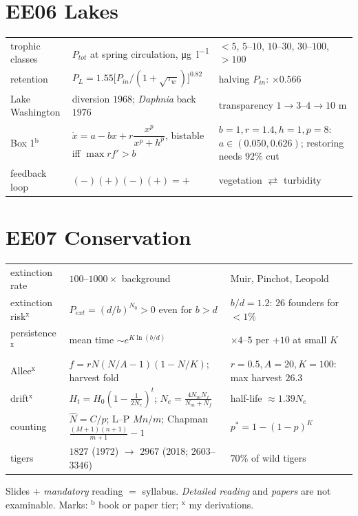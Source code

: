 \documentclass[9pt]{article}
\begin{document}
\section*{EE06 Lakes}
\begin{tabular}{@{}p{2.6cm}p{8.2cm}p{6.6cm}@{}}
\toprule
trophic classes & $P_{tot}$ at spring circulation, \unit{\micro\gram\per\litre} & $<5$, $5$--$10$, $10$--$30$, $30$--$100$, $>100$\\
retention & $P_L=1.55\bigl[P_{in}/(1+\sqrt{\tau_w})\bigr]^{0.82}$ & halving $P_{in}$: $\times0.566$\\
Lake Washington & diversion $1968$; \emph{Daphnia} back $1976$ & transparency $1\to3\text{--}4\to10$ m\\
Box 1$^{\text{b}}$ & $\dot x=a-bx+r\dfrac{x^p}{x^p+h^p}$, bistable iff $\max rf'>b$ & $b{=}1,r{=}1.4,h{=}1,p{=}8$: $a\in(0.050,0.626)$; restoring needs $92\%$ cut\\
feedback loop & $(-)(+)(-)(+)=+$ & vegetation $\rightleftarrows$ turbidity\\
\bottomrule
\end{tabular}

\section*{EE07 Conservation}
\begin{tabular}{@{}p{2.6cm}p{8.2cm}p{6.6cm}@{}}
\toprule
extinction rate & $100$--$1000\times$ background & Muir, Pinchot, Leopold\\
extinction risk$^{\text{x}}$ & $P_{ext}=(d/b)^{N_0}>0$ even for $b>d$ & $b/d=1.2$: $26$ founders for $<1\%$\\
persistence$^{\text{x}}$ & mean time $\sim e^{K\ln(b/d)}$ & $\times4$--$5$ per $+10$ at small $K$\\
Allee$^{\text{x}}$ & $f=rN(N/A-1)(1-N/K)$; harvest fold & $r{=}0.5,A{=}20,K{=}100$: max harvest $26.3$\\
drift$^{\text{x}}$ & $H_t=H_0(1-\tfrac1{2N_e})^t$; \quad $N_e=\tfrac{4N_mN_f}{N_m+N_f}$ & half-life $\approx1.39N_e$\\
counting & $\hat N=C/\hat p$; \quad L--P $Mn/m$; \quad Chapman $\tfrac{(M+1)(n+1)}{m+1}-1$ & $p^*=1-(1-p)^K$\\
tigers & $1827$ (1972) $\to$ $2967$ (2018; $2603$--$3346$) & $70\%$ of wild tigers\\
\bottomrule
\end{tabular}

\vspace{4pt}
\begin{keybox}
Slides $+$ \emph{mandatory} reading $=$ syllabus. \emph{Detailed reading} and \emph{papers} are not examinable. Marks: $^{\text{b}}$ book or paper tier; $^{\text{x}}$ my derivations.
\end{keybox}
\end{document}
